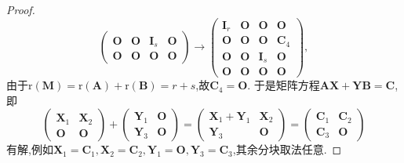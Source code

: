 \documentclass[../../main.tex]{subfiles}%
\begin{document}
\begin{proof}
\[\begin{pmatrix}
\boldsymbol{O}&\boldsymbol{O}&\boldsymbol{I}_s&\boldsymbol{O}\\
\boldsymbol{O}&\boldsymbol{O}&\boldsymbol{O}&\boldsymbol{O}
\end{pmatrix}\to\begin{pmatrix}
\boldsymbol{I}_r&\boldsymbol{O}&\boldsymbol{O}&\boldsymbol{O}\\
\boldsymbol{O}&\boldsymbol{O}&\boldsymbol{O}&\boldsymbol{C}_4\\
\boldsymbol{O}&\boldsymbol{O}&\boldsymbol{I}_s&\boldsymbol{O}\\
\boldsymbol{O}&\boldsymbol{O}&\boldsymbol{O}&\boldsymbol{O}
\end{pmatrix},
\]
由于\(\mathrm{r}(\boldsymbol{M})=\mathrm{r}(\boldsymbol{A})+\mathrm{r}(\boldsymbol{B})=r + s\),故\(\boldsymbol{C}_4=\boldsymbol{O}\). 于是矩阵方程\(\boldsymbol{A}\boldsymbol{X}+\boldsymbol{Y}\boldsymbol{B}=\boldsymbol{C}\),即
\[
\begin{pmatrix}
\boldsymbol{X}_1&\boldsymbol{X}_2\\
\boldsymbol{O}&\boldsymbol{O}
\end{pmatrix}+\begin{pmatrix}
\boldsymbol{Y}_1&\boldsymbol{O}\\
\boldsymbol{Y}_3&\boldsymbol{O}
\end{pmatrix}=\begin{pmatrix}
\boldsymbol{X}_1+\boldsymbol{Y}_1&\boldsymbol{X}_2\\
\boldsymbol{Y}_3&\boldsymbol{O}
\end{pmatrix}=\begin{pmatrix}
\boldsymbol{C}_1&\boldsymbol{C}_2\\
\boldsymbol{C}_3&\boldsymbol{O}
\end{pmatrix}
\]
有解,例如\(\boldsymbol{X}_1=\boldsymbol{C}_1,\boldsymbol{X}_2=\boldsymbol{C}_2,\boldsymbol{Y}_1=\boldsymbol{O},\boldsymbol{Y}_3=\boldsymbol{C}_3\),其余分块取法任意.

\end{proof}
\end{document}
